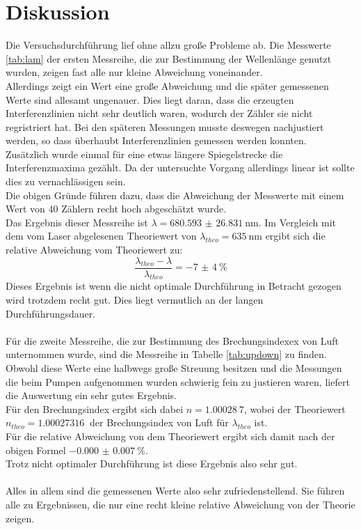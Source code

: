 \newpage
\section{Diskussion}

\noindent Die Versuchsdurchführung lief ohne allzu große Probleme ab. 
Die Messwerte \ref{tab:lam} der ersten Messreihe, die zur Bestimmung der Wellenlänge genutzt wurden, zeigen fast alle nur kleine Abweichung voneinander.\\
Allerdings zeigt ein Wert eine große Abweichung und die später gemessenen Werte sind allesamt ungenauer. Dies liegt daran, dass die erzeugten Interferenzlinien nicht sehr deutlich waren, wodurch der Zähler sie nicht regristriert hat.
Bei den späteren Messungen musste deswegen nachjustiert werden, so dass überhaubt Interferenzlinien gemessen werden konnten.\\
Zusätzlich wurde einmal für eine etwas längere Spiegelstrecke die Interferenzmaxima gezählt. Da der untersuchte Vorgang allerdings linear ist sollte dies zu vernachlässigen sein.\\
Die obigen Gründe führen dazu, dass die Abweichung der Messwerte mit einem Wert von $40$ Zählern recht hoch abgeschätzt wurde.\\
Das Ergebnis dieser Messreihe ist $\lambda= \SI{680.593(26831)}{\nano\metre}$.
Im Vergleich mit dem vom Laser abgelesenen Theoriewert von $\lambda_{theo}=\SI{635}{\nano\metre}$ ergibt sich die relative Abweichung vom Theoriewert zu:
\begin{equation*}
    \frac{\lambda_{theo}-\lambda}{\lambda_{theo}}=\SI{-7(4)}{\percent}
\end{equation*}
Dieses Ergebnis ist wenn die nicht optimale Durchführung in Betracht gezogen wird trotzdem recht gut. Dies liegt vermutlich an der langen Durchführungsdauer.\\\\

\noindent Für die zweite Messreihe, die zur Bestimmung des Brechungsindexex von Luft unternommen wurde, sind die Messreihe in Tabelle \ref{tab:updown} zu finden. 
Obwohl diese Werte eine halbwegs große Streuung besitzen und die Messungen die beim Pumpen aufgenommen wurden schwierig fein zu justieren waren, liefert die Auswertung ein sehr gutes Ergebnis.\\
Für den Brechungsindex ergibt sich dabei $n=\SI{1.00028}{7}$, wobei der Theoriewert $n_{theo}=\SI{1.00027316}{}$\cite{n} der Brechungsindex von Luft für $\lambda_{theo}$ ist.\\
Für die relative Abweichung von dem Theoriewert ergibt sich damit nach der obigen Formel  $\SI{-0.000(0007)}{\percent}$.\\
Trotz nicht optimaler Durchführung ist diese Ergebnis also sehr gut.\\\\
Alles in allem sind die gemessenen Werte also sehr zufriedenstellend. Sie führen alle zu Ergebnissen, die nur eine recht kleine relative Abweichung von der Theorie zeigen. 
\newpage
